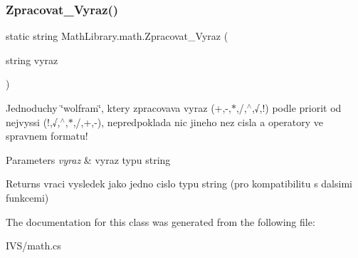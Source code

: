 \subsubsection{\texorpdfstring{Zpracovat\+\_\+\+Vyraz()}{Zpracovat\_Vyraz()}}
{\footnotesize\ttfamily static string Math\+Library.\+math.\+Zpracovat\+\_\+\+Vyraz (\begin{DoxyParamCaption}\item[{string}]{vyraz }\end{DoxyParamCaption})\hspace{0.3cm}{\ttfamily [static]}}



Jednoduchy \char`\"{}wolfram\char`\"{}, ktery zpracovava vyraz (+,-\/,$\ast$,/,$^\wedge$,√,!) podle priorit od nejvyssi (!,√,$^\wedge$,$\ast$,/,+,-\/), nepredpoklada nic jineho nez cisla a operatory ve spravnem formatu! 


\begin{DoxyParams}{Parameters}
{\em vyraz} & vyraz typu string\\
\hline
\end{DoxyParams}
\begin{DoxyReturn}{Returns}
vraci vysledek jako jedno cislo typu string (pro kompatibilitu s dalsimi funkcemi)
\end{DoxyReturn}


The documentation for this class was generated from the following file\+:\begin{DoxyCompactItemize}
\item 
I\+V\+S/math.\+cs\end{DoxyCompactItemize}
